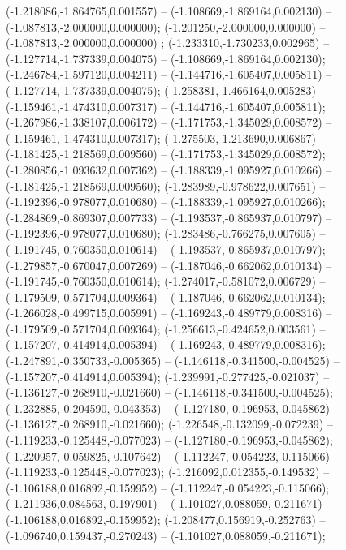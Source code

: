  (-1.218086,-1.864765,0.001557) -- (-1.108669,-1.869164,0.002130) -- (-1.087813,-2.000000,0.000000);
 (-1.201250,-2.000000,0.000000) -- (-1.087813,-2.000000,0.000000) ;
 (-1.233310,-1.730233,0.002965) -- (-1.127714,-1.737339,0.004075) -- (-1.108669,-1.869164,0.002130);
 (-1.246784,-1.597120,0.004211) -- (-1.144716,-1.605407,0.005811) -- (-1.127714,-1.737339,0.004075);
 (-1.258381,-1.466164,0.005283) -- (-1.159461,-1.474310,0.007317) -- (-1.144716,-1.605407,0.005811);
 (-1.267986,-1.338107,0.006172) -- (-1.171753,-1.345029,0.008572) -- (-1.159461,-1.474310,0.007317);
 (-1.275503,-1.213690,0.006867) -- (-1.181425,-1.218569,0.009560) -- (-1.171753,-1.345029,0.008572);
 (-1.280856,-1.093632,0.007362) -- (-1.188339,-1.095927,0.010266) -- (-1.181425,-1.218569,0.009560);
 (-1.283989,-0.978622,0.007651) -- (-1.192396,-0.978077,0.010680) -- (-1.188339,-1.095927,0.010266);
 (-1.284869,-0.869307,0.007733) -- (-1.193537,-0.865937,0.010797) -- (-1.192396,-0.978077,0.010680);
 (-1.283486,-0.766275,0.007605) -- (-1.191745,-0.760350,0.010614) -- (-1.193537,-0.865937,0.010797);
 (-1.279857,-0.670047,0.007269) -- (-1.187046,-0.662062,0.010134) -- (-1.191745,-0.760350,0.010614);
 (-1.274017,-0.581072,0.006729) -- (-1.179509,-0.571704,0.009364) -- (-1.187046,-0.662062,0.010134);
 (-1.266028,-0.499715,0.005991) -- (-1.169243,-0.489779,0.008316) -- (-1.179509,-0.571704,0.009364);
 (-1.256613,-0.424652,0.003561) -- (-1.157207,-0.414914,0.005394) -- (-1.169243,-0.489779,0.008316);
 (-1.247891,-0.350733,-0.005365) -- (-1.146118,-0.341500,-0.004525) -- (-1.157207,-0.414914,0.005394);
 (-1.239991,-0.277425,-0.021037) -- (-1.136127,-0.268910,-0.021660) -- (-1.146118,-0.341500,-0.004525);
 (-1.232885,-0.204590,-0.043353) -- (-1.127180,-0.196953,-0.045862) -- (-1.136127,-0.268910,-0.021660);
 (-1.226548,-0.132099,-0.072239) -- (-1.119233,-0.125448,-0.077023) -- (-1.127180,-0.196953,-0.045862);
 (-1.220957,-0.059825,-0.107642) -- (-1.112247,-0.054223,-0.115066) -- (-1.119233,-0.125448,-0.077023);
 (-1.216092,0.012355,-0.149532) -- (-1.106188,0.016892,-0.159952) -- (-1.112247,-0.054223,-0.115066);
 (-1.211936,0.084563,-0.197901) -- (-1.101027,0.088059,-0.211671) -- (-1.106188,0.016892,-0.159952);
 (-1.208477,0.156919,-0.252763) -- (-1.096740,0.159437,-0.270243) -- (-1.101027,0.088059,-0.211671);
